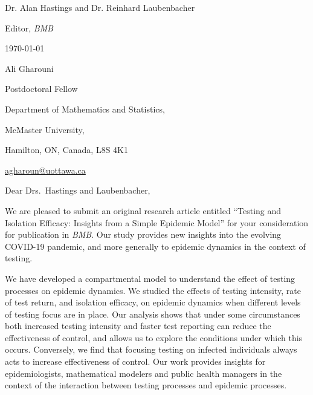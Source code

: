 \documentclass[12pt,letterpaper]{letter}
\newcommand{\journalname}{\emph{BMB}}
\begin{document}
\begin{multicols}{2}
\footnotesize
\begin{flushleft}

Dr. Alan Hastings and Dr. Reinhard Laubenbacher

Editor, \journalname{}

\vfill

{\normalsize \mydate
\today}
\end{flushleft}

\columnbreak

\begin{flushright}
Ali Gharouni

Postdoctoral Fellow 

Department of Mathematics and Statistics,

McMaster University,

Hamilton, ON, Canada, L8S 4K1

\href{mailto:agharoun@uottawa.ca}{agharoun@uottawa.ca}
\end{flushright}

\end{multicols}

\setlength{\parskip}{1em}
\thispagestyle{empty}

\vspace{-1em}

Dear Drs.\ Hastings and Laubenbacher,

We are pleased to submit an original research article entitled
``Testing and Isolation Efficacy: Insights from a Simple Epidemic
Model'' for your consideration for publication in \journalname{}.  Our
study provides new insights into the evolving COVID-19 pandemic, and
more generally to epidemic dynamics in the context of testing.

We have developed a compartmental model to understand the effect of testing processes on epidemic dynamics. We studied the effects of testing intensity, rate of test return, and isolation efficacy, on epidemic dynamics when different levels of testing focus are in place. Our analysis shows that under some circumstances both increased testing intensity and faster test reporting can reduce the effectiveness of control, and allows us to explore the conditions under which this occurs. Conversely, we find that focusing testing on infected individuals always acts to increase effectiveness of control. Our work provides insights for epidemiologists, mathematical modelers and public health managers in the context of the interaction between testing processes and epidemic processes.
\end{document}
